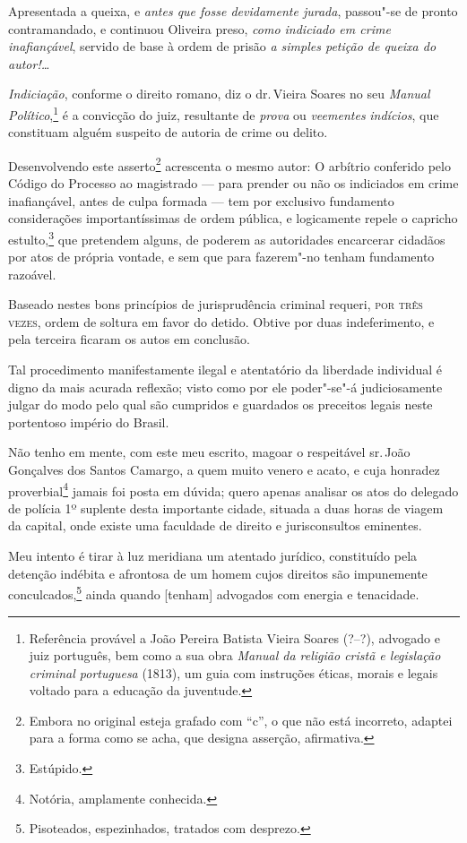 Apresentada a queixa, e \emph{antes que fosse devidamente jurada},
passou"-se de pronto contramandado, e continuou Oliveira preso,
\emph{como indiciado em crime inafiançável}, servido de base à ordem de
prisão \emph{a simples petição de queixa do autor!\ldots{} }

\emph{Indiciação}, conforme o direito romano, diz o dr.\,Vieira Soares no
seu \emph{Manual Político},\footnote{Referência provável a João Pereira
  Batista Vieira Soares (?--?), advogado e juiz português, bem como a sua
  obra \emph{Manual da religião cristã e legislação criminal portuguesa}
  (1813), um guia com instruções éticas, morais e legais voltado para a
  educação da juventude.} é a convicção do juiz, resultante de
\emph{prova} ou \emph{veementes} \emph{indícios}, que constituam alguém
suspeito de autoria de crime ou delito.

Desenvolvendo este asserto\footnote{Embora no original esteja grafado com ``c'',
  o que não está incorreto, adaptei para a forma como se
  acha, que designa asserção, afirmativa.} acrescenta o mesmo autor: O
arbítrio conferido pelo Código do Processo ao magistrado --- para
prender ou não os indiciados em crime inafiançável, antes de culpa
formada --- tem por exclusivo fundamento considerações importantíssimas
de ordem pública, e logicamente repele o capricho estulto,\footnote{Estúpido.} que pretendem alguns, de poderem as autoridades encarcerar
cidadãos por atos de própria vontade, e sem que para fazerem"-no tenham
fundamento razoável.

Baseado nestes bons princípios de jurisprudência criminal requeri, \textsc{por
três vezes}, ordem de soltura em favor do detido. Obtive por duas
indeferimento, e pela terceira ficaram os autos em conclusão.

Tal procedimento manifestamente ilegal e atentatório da liberdade
individual é digno da mais acurada reflexão; visto como por ele
poder"-se"-á judiciosamente julgar do modo pelo qual são cumpridos e
guardados os preceitos legais neste portentoso império do Brasil.

Não tenho em mente, com este meu escrito, magoar o respeitável sr.\,João
Gonçalves dos Santos Camargo, a quem muito venero e acato, e cuja
honradez proverbial\footnote{Notória, amplamente conhecida.} jamais
foi posta em dúvida; quero apenas analisar os atos do delegado de
polícia 1º suplente desta importante cidade, situada a duas horas de
viagem da capital, onde existe uma faculdade de direito e jurisconsultos
eminentes.

Meu intento é tirar à luz meridiana um atentado jurídico, constituído
pela detenção indébita e afrontosa de um homem cujos direitos são
impunemente conculcados,\footnote{Pisoteados, espezinhados, tratados
  com desprezo.} ainda quando {[}tenham{]} advogados com energia e
tenacidade.


